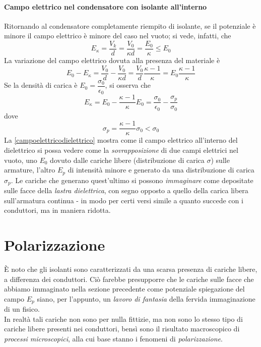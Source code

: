 \paragraph{Campo elettrico nel condensatore con isolante all'interno}
Ritornando al condensatore completamente riempito di isolante, se il potenziale è minore il campo elettrico è minore del caso nel vuoto; si vede, infatti, che
\begin{equation*}
	E_{\kappa}=\frac{V_k}{d}=\frac{V_0}{\kappa d}=\frac{E_0}{\kappa}\leq E_0
\end{equation*} 
La variazione del campo elettrico dovuta alla presenza del materiale è
\begin{equation*}
	E_0-E_{\kappa}=\frac{V_0}{d}-\frac{V_0}{\kappa d}=\frac{V_0}{d}\frac{\kappa-1}{\kappa}=E_0\frac{\kappa - 1}{\kappa}
\end{equation*}
Se la densità di carica è $E_0=\dfrac{\sigma_0}{\epsilon_0}$, si osserva che 
\begin{equation}\label{campoelettricodielettrico}
	E_{\kappa}=E_0-\frac{\kappa-1}{\kappa}E_0=\frac{\sigma_0}{\epsilon_0}-\frac{\sigma_p}{\sigma_0}
\end{equation}
dove
\begin{equation}
	\sigma_p=\frac{\kappa-1}{\kappa}\sigma_0<\sigma_0
\end{equation}
La \eqref{campoelettricodielettrico} mostra come il campo elettrico all'interno del dielettrico si possa vedere come la \textit{sovrapposizione} di due campi elettrici nel vuoto, uno $E_0$ dovuto dalle cariche libere (distribuzione di carica $\sigma$) sulle armature, l'altro $E_p$ di intensità minore e generato da una distribuzione di carica $\sigma_p$. Le cariche che generano quest'ultimo si possono \textit{immaginare} come depositate sulle facce della \textit{lastra dielettrica}, con segno opposto a quello della carica libera sull'armatura continua - in modo per certi versi simile a quanto succede con i conduttori, ma in maniera ridotta.
\section{Polarizzazione}
È noto che gli isolanti sono caratterizzati da una scarsa presenza di cariche libere, a differenza dei conduttori. Ciò farebbe presupporre che le cariche sulle facce che abbiamo immaginato nella sezione precedente come potenziale spiegazione del campo $E_p$ siano, per l'appunto, un \textit{lavoro di fantasia} della fervida immaginazione di un fisico.\\
In realtà tali cariche non sono per nulla fittizie, ma non sono lo stesso tipo di cariche libere presenti nei conduttori, bensì sono il risultato macroscopico di \textit{processi microscopici}, alla cui base stanno i fenomeni di \textit{polarizzazione}.

